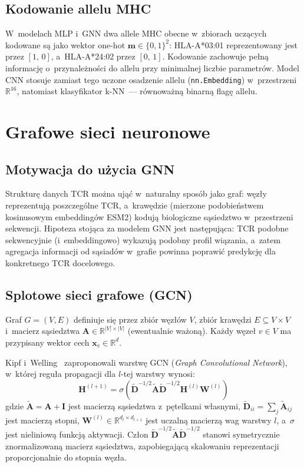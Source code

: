\documentclass{SGGW-thesis}
\begin{document}
\subsection{Kodowanie allelu MHC}
\label{sec:mhc_encoding}

W~modelach MLP i~GNN dwa allele MHC obecne w~zbiorach uczących kodowane są jako wektor one-hot
$\mathbf{m} \in \{0,1\}^2$: HLA-A*03:01 reprezentowany jest przez $[1,\,0]$,
a~HLA-A*24:02 przez $[0,\,1]$. Kodowanie zachowuje pełną informację o~przynależności do allelu
przy minimalnej liczbie parametrów. Model CNN stosuje zamiast tego uczone osadzenie allelu
(\texttt{nn.Embedding}) w~przestrzeni $\mathbb{R}^{16}$, natomiast klasyfikator k-NN~---
równoważną binarną flagę allelu.

\section{Grafowe sieci neuronowe}

\subsection{Motywacja do użycia GNN}

Strukturę danych TCR można ująć w~naturalny sposób jako graf: węzły reprezentują poszczególne TCR,
a~krawędzie (mierzone podobieństwem kosinusowym embeddingów ESM2) kodują biologiczne sąsiedztwo
w~przestrzeni sekwencji. Hipoteza stojąca za modelem GNN jest następująca: TCR podobne sekwencyjnie
(i~embeddingowo) wykazują podobny profil wiązania, a~zatem agregacja informacji od sąsiadów w~grafie
powinna poprawić predykcję dla konkretnego TCR docelowego.

\subsection{Splotowe sieci grafowe (GCN)}

Graf $G = (V, E)$ definiuje się przez zbiór węzłów $V$, zbiór krawędzi $E \subseteq V \times V$
i~macierz sąsiedztwa $\mathbf{A} \in \mathbb{R}^{|V| \times |V|}$ (ewentualnie ważoną). Każdy
węzeł $v \in V$ ma przypisany wektor cech $\mathbf{x}_v \in \mathbb{R}^d$.

Kipf i~Welling~\cite{kipf2017} zaproponowali warstwę GCN (\textit{Graph Convolutional Network}),
w~której reguła propagacji dla $l$-tej warstwy wynosi:
\begin{equation}
    \mathbf{H}^{(l+1)} = \sigma\!\left(\tilde{\mathbf{D}}^{-1/2}\tilde{\mathbf{A}}\tilde{\mathbf{D}}^{-1/2}\mathbf{H}^{(l)}\mathbf{W}^{(l)}\right)
    \label{eq:gcn}
\end{equation}
gdzie $\tilde{\mathbf{A}} = \mathbf{A} + \mathbf{I}$ jest macierzą sąsiedztwa z~pętelkami własnymi,
$\tilde{\mathbf{D}}_{ii} = \sum_j \tilde{\mathbf{A}}_{ij}$ jest macierzą stopni,
$\mathbf{W}^{(l)} \in \mathbb{R}^{d_l \times d_{l+1}}$ jest uczalną macierzą wag warstwy $l$,
a~$\sigma$ jest nieliniową funkcją aktywacji. Człon $\tilde{\mathbf{D}}^{-1/2}\tilde{\mathbf{A}}\tilde{\mathbf{D}}^{-1/2}$
stanowi symetrycznie znormalizowaną macierz sąsiedztwa, zapobiegającą skalowaniu reprezentacji
proporcjonalnie do stopnia węzła.
\end{document}
